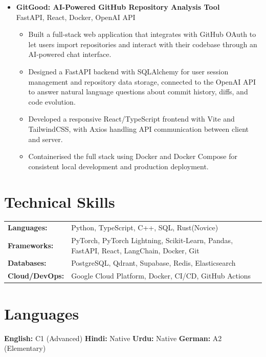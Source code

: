 \documentclass[a4paper,11pt]{article}
\newcommand{\cvitem}[1]{\item\small{#1}}
\newcommand{\cvproject}[2]{
  \vspace{2pt}
  \textbf{#1}\\
  \small{#2}\vspace{-4pt}
}
\newenvironment{cvitemlist}
  {\begin{itemize}[leftmargin=0.4cm, topsep=1pt, itemsep=0pt, parsep=0pt, label=\textbullet]}
  {\end{itemize}}
\newenvironment{cvsection}
  {\begin{itemize}[leftmargin=0cm, label={}, topsep=0pt, itemsep=-2pt]}
  {\end{itemize}}
\begin{document}
\begin{cvsection}
  \item
  \cvproject
    {GitGood: AI-Powered GitHub Repository Analysis Tool \href{https://github.com/nnayz/gitgood}{\faGithub}}
    {FastAPI, React, Docker, OpenAI API}
  \begin{cvitemlist}
    \cvitem{Built a full-stack web application that integrates with GitHub OAuth to let users import repositories and interact with their codebase through an AI-powered chat interface.}
    \cvitem{Designed a FastAPI backend with SQLAlchemy for user session management and repository data storage, connected to the OpenAI API to answer natural language questions about commit history, diffs, and code evolution.}
    \cvitem{Developed a responsive React/TypeScript frontend with Vite and TailwindCSS, with Axios handling API communication between client and server.}
    \cvitem{Containerised the full stack using Docker and Docker Compose for consistent local development and production deployment.}
  \end{cvitemlist}

\end{cvsection}

\section{Technical Skills}

\begin{tabular}{@{}p{3.2cm}p{13cm}@{}}
  \textbf{Languages:} & Python, TypeScript, C++, SQL, Rust(Novice) \\[2pt]
  \textbf{Frameworks:} & PyTorch, PyTorch Lightning, Scikit-Learn, Pandas, FastAPI, React, LangChain, Docker, Git \\[2pt]
  \textbf{Databases:} & PostgreSQL, Qdrant, Supabase, Redis, Elasticsearch \\[2pt]
  \textbf{Cloud/DevOps:} & Google Cloud Platform, Docker, CI/CD, GitHub Actions \\[2pt]
\end{tabular}

\section{Languages}

\noindent
\textbf{English:} C1 (Advanced) \quad
\textbf{Hindi:} Native \quad
\textbf{Urdu:} Native \quad
\textbf{German:} A2 (Elementary)
\end{document}
